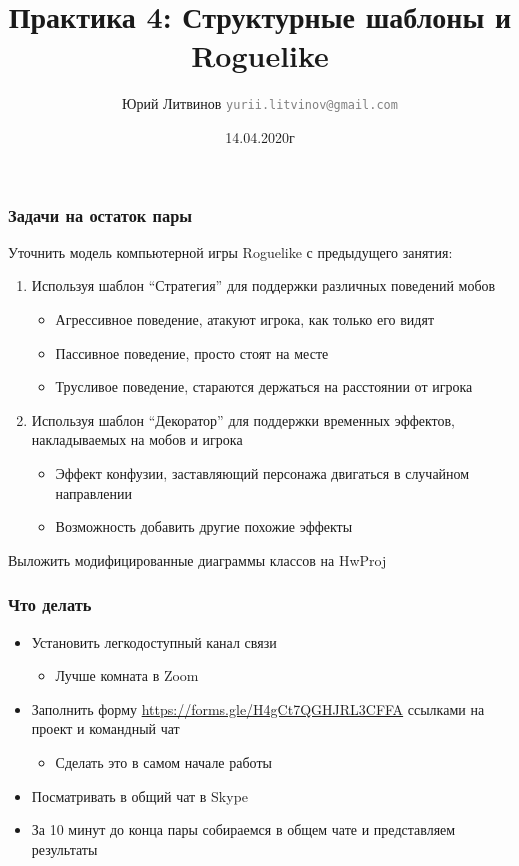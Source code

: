 \documentclass[xetex,mathserif,serif]{beamer}
\title{Практика 4: Структурные шаблоны и Roguelike}
\author[Юрий Литвинов]{Юрий Литвинов \newline \textcolor{gray}{\small\texttt{yurii.litvinov@gmail.com}}}
\date{14.04.2020г}
\begin{document}
	
	\frame{\titlepage}

	\begin{frame}
		\frametitle{Задачи на остаток пары}
		Уточнить модель компьютерной игры Roguelike с предыдущего занятия:

		\begin{enumerate}
			\item Используя шаблон ``Стратегия'' для поддержки различных поведений мобов
			\begin{itemize}
				\item Агрессивное поведение, атакуют игрока, как только его видят
				\item Пассивное поведение, просто стоят на месте
				\item Трусливое поведение, стараются держаться на расстоянии от игрока
			\end{itemize}
			\item Используя шаблон ``Декоратор'' для поддержки временных эффектов, накладываемых на мобов и игрока
			\begin{itemize}
				\item Эффект конфузии, заставляющий персонажа двигаться в случайном направлении
				\item Возможность добавить другие похожие эффекты
			\end{itemize}
		\end{enumerate}

		Выложить модифицированные диаграммы классов на HwProj
	\end{frame}

	\begin{frame}
		\frametitle{Что делать}
		\begin{itemize}
			\item Установить легкодоступный канал связи
			\begin{itemize}
				\item Лучше комната в Zoom
			\end{itemize}
			\item Заполнить форму \url{https://forms.gle/H4gCt7QGHJRL3CFFA} ссылками на проект и командный чат
			\begin{itemize}
				\item Сделать это в самом начале работы
			\end{itemize}
			\item Посматривать в общий чат в Skype
			\item За 10 минут до конца пары собираемся в общем чате и представляем результаты
		\end{itemize}
	\end{frame}
\end{document}
